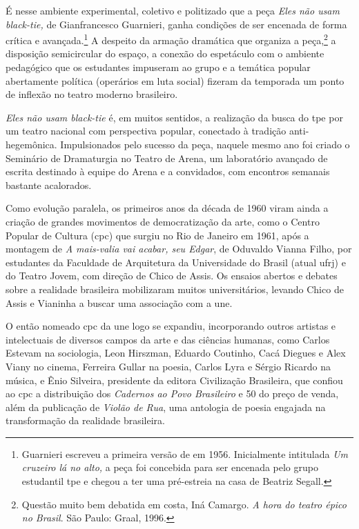 {É nesse ambiente experimental, coletivo e politizado que a peça
{\it Eles não usam black-tie,} de Gianfrancesco Guarnieri, ganha
condições de ser encenada de forma crítica e avançada.\footnote{Guarnieri
  escreveu a primeira versão de em 1956. Inicialmente intitulada {\it Um
  cruzeiro lá no alto,} a peça foi concebida para ser encenada pelo
  grupo estudantil {\sc tpe} e chegou a ter uma pré-estreia na casa de Beatriz
  Segall.} A despeito da armação dramática que organiza a
peça,\footnote{Questão muito bem debatida em {\sc costa}, Iná Camargo. {\it A
  hora do teatro épico no Brasil}. São Paulo: Graal, 1996.} a
disposição semicircular do espaço, a conexão do espetáculo com o
ambiente pedagógico que os estudantes impuseram ao grupo e a temática
popular abertamente política (operários em luta social) fizeram da
temporada um ponto de inflexão no teatro moderno brasileiro.

{\it Eles não usam black-tie} é, em muitos sentidos, a realização da
busca do {\sc tpe} por um teatro nacional com perspectiva popular, conectado à
tradição anti-hegemônica. Impulsionados pelo sucesso da peça, naquele
mesmo ano foi criado o Seminário de Dramaturgia no Teatro de Arena, um
laboratório avançado de escrita destinado à equipe do Arena e a
convidados, com encontros semanais bastante acalorados.

Como evolução paralela, os primeiros anos da década de 1960 viram ainda
a criação de grandes movimentos de democratização da arte, como o Centro
Popular de Cultura ({\sc cpc}) que surgiu no Rio de Janeiro em 1961, após a
montagem de {\it A mais-valia vai acabar, seu Edgar}, de Oduvaldo Vianna
Filho, por estudantes da Faculdade de Arquitetura da Universidade do
Brasil (atual {\sc ufrj}) e do Teatro Jovem, com direção de Chico de Assis. Os
ensaios abertos e debates sobre a realidade brasileira mobilizaram
muitos universitários, levando Chico de Assis e Vianinha a buscar uma
associação com a {\sc une}.

O então nomeado {\sc cpc} da {\sc une} logo se expandiu, incorporando outros
artistas e intelectuais de diversos campos da arte e das ciências
humanas, como Carlos Estevam na sociologia, Leon Hirszman, Eduardo
Coutinho, Cacá Diegues e Alex Viany no cinema, Ferreira Gullar na
poesia, Carlos Lyra e Sérgio Ricardo na música, e Ênio Silveira,
presidente da editora Civilização Brasileira, que confiou ao {\sc cpc} a
distribuição dos {\it Cadernos ao Povo Brasileiro} e 50
do preço de venda, além da publicação de {\it Violão de Rua}, uma
antologia de poesia engajada na transformação da realidade brasileira.

}
